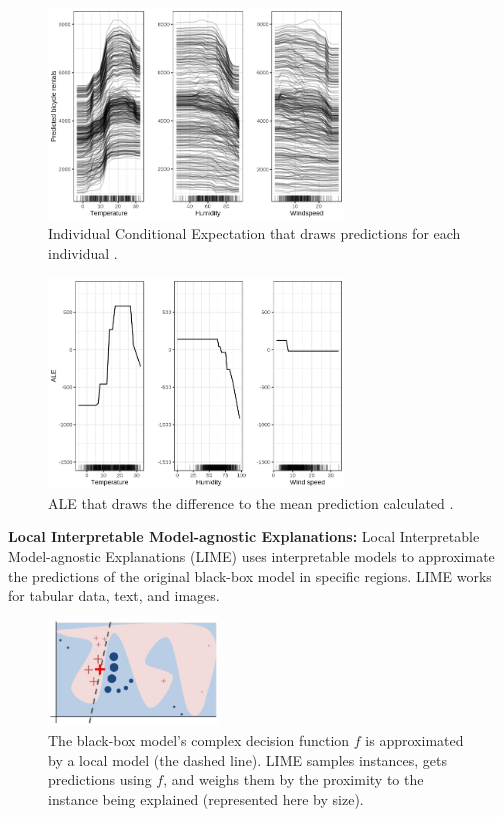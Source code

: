 \begin{figure}[H]
\centering
\includegraphics[width=0.7\textwidth]{figures/chapter_defence/ice.png}
\caption{Individual Conditional Expectation that draws predictions for each individual \cite{molnar2019}.}
\label{fig.ice}
\end{figure}

\begin{figure}[H]
\centering
\includegraphics[width=0.7\textwidth]{figures/chapter_defence/ale.png}
\caption{ALE that draws the difference to the mean prediction calculated \cite{molnar2019}.}
\label{fig.ale}
\end{figure}

\clearpage

\textbf{Local Interpretable Model-agnostic Explanations:} Local Interpretable Model-agnostic Explanations (LIME) uses interpretable models to approximate the predictions of the original black-box model in specific regions. LIME works for tabular data, text, and images.

\begin{figure}[H]
\centering
\includegraphics[width=0.4\textwidth]{figures/chapter_defence/lime.jpg}
\caption{The black-box model’s complex decision function $f$ is approximated by a local model (the dashed line). LIME samples instances, gets predictions using $f$, and weighs them by the proximity to the instance being explained (represented here by size). \cite{ribeiro2016should}}
\label{fig.lime}
\end{figure}


